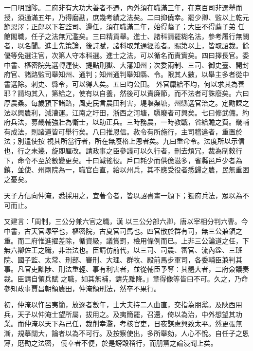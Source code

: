 \begin{pinyinscope}
 一曰明黜陟。二府非有大功大善者不遷，內外須在職滿三年，在京百司非選舉而授，須通滿五年，乃得磨勘，庶幾考績之法矣。二曰抑僥幸。罷少卿、監以上乾元節恩澤；正郎以下若監司、邊任，須在職滿二年，始得蔭子；大臣不得薦子弟
 任館閣職，任子之法無冗濫矣。三曰精貢舉。進士、諸科請罷糊名法，參考履行無闕者，以名聞。進士先策論，後詩賦，諸科取兼通經義者。賜第以上，皆取詔裁。餘優等免選注官，次第人守本科選。進士之法，可以循名而責實矣。四曰擇長官。委中書、樞密院先選轉運使、提點刑獄、大藩知州；次委兩制、三司、御史臺、開封府官、諸路監司舉知州、通判；知州通判舉知縣、令。限其人數，以舉主多者從中書選除。刺史、縣令，可以得人矣。五曰均公田。
 外官廩給不均，何以求其為善耶？請均其入，第給之，使有以自養，然後可以責廉節，而不法者可誅廢矣。六曰厚農桑。每歲預下諸路，風吏民言農田利害，堤堰渠塘，州縣選官治之。定勸課之法以興農利，減漕運。江南之圩田，浙西之河塘，隳廢者可興矣。七曰修武備。約府兵法，募畿輔強壯為衛士，以助正兵。三時務農，一時教戰，省給贍之費。畿輔有成法，則諸道皆可舉行矣。八曰推恩信。赦令有所施行，主司稽違者，重置於法；別遣使按
 視其所當行者，所在無廢格上恩者矣。九曰重命令。法度所以示信也，行之未幾，旋即厘改。請政事之臣參議可以久行者，刪去煩冗，裁為制敕行下，命令不至於數變更矣。十曰減徭役。戶口耗少而供億滋多，省縣邑戶少者為鎮，並使、州兩院為一，職官白直，給以州兵，其不應受役者悉歸之農，民無重困之憂矣。



 天子方信向仲淹，悉採用之，宜著令者，皆以詔書畫一頒下；獨府兵法，眾以為不可而止。



 又建言：「周制，三公分兼六官之職，漢
 以三公分部六卿，唐以宰相分判六曹。今中書，古天官塚宰也，樞密院，古夏官司馬也。四官散於群有司，無三公兼領之重。而二府惟進擢差除，循資級，議賞罰，檢用條例而已。上非三公論道之任，下無六卿佐王之職，非治法也。臣請仿前代，以三司、司農、審官、流內銓、三班院、國子監、太常、刑部、審刑、大理、群牧、殿前馬步軍司，各委輔臣兼判其事。凡官吏黜陟、刑法重輕、事有利害者，並從輔臣予奪：其體大者，二府僉議奏裁。臣請自領兵賦
 之職，如其無補，請先黜降。」章得像等皆曰不可。久之，乃命參知政事賈昌朝領農田，仲淹領刑法，然卒不果行。



 初，仲淹以忤呂夷簡，放逐者數年，士大夫持二人曲直，交指為朋黨。及陜西用兵，天子以仲淹士望所屬，拔用之。及夷簡罷，召還，倚以為治，中外想望其功業。而仲淹以天下為己任，裁削幸濫，考核官吏，日夜謀慮興致太平。然更張無漸，規摹闊大，論者以為不可行。及按察使出，多所舉劾，人心不悅。自任子之恩薄，磨勘之法密，
 僥幸者不便，於是謗毀稍行，而朋黨之論浸聞上矣。




\end{pinyinscope}
